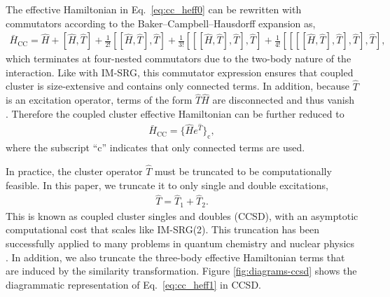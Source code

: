 The effective Hamiltonian in Eq.\ \eqref{eq:cc_heff0} can be rewritten with commutators according to the Baker--Campbell--Hausdorff expansion as,
\begin{align*}
  \bar{H}_{\mathrm{CC}} = \hat{H} + [\hat{H}, \hat{T}] + \frac{1}{2!} [[\hat{H}, \hat{T} ], \hat{T}] + \frac{1}{3!} [[[\hat{H}, \hat{T}], \hat{T}], \hat{T}] + \frac{1}{4!} [[[[\hat{H}, \hat{T}], \hat{T}], \hat{T}], \hat{T}],
\end{align*}
which terminates at four-nested commutators due to the two-body nature of the interaction.  Like with IM-SRG, this commutator expression ensures that coupled cluster is size-extensive and contains only connected terms.  In addition, because $\hat{T}$ is an excitation operator, terms of the form $\hat{T} \hat{H}$ are disconnected and thus vanish \cite{shavitt2009many}.  Therefore the coupled cluster effective Hamiltonian can be further reduced to
\begin{align} \label{eq:cc_heff1}
  \bar{H}_{\mathrm{CC}} = \bigl\{\hat{H}e^{\hat{T}}\bigr\}_{\mathrm{c}},
\end{align}
where the subscript ``$\mathrm{c}$'' indicates that only connected terms are used.

In practice, the cluster operator $\hat{T}$ must be truncated to be computationally feasible.  In this paper, we truncate it to only single and double excitations,
\begin{align*}
  \hat{T} = \hat{T}_1 + \hat{T}_2.
\end{align*}
This is known as coupled cluster singles and doubles (CCSD), with an asymptotic computational cost that scales like IM-SRG(2).  This truncation has been successfully applied to many problems in quantum chemistry \cite{RevModPhys.79.291} and nuclear physics \cite{0034-4885-77-9-096302}.  In addition, we also truncate the three-body effective Hamiltonian terms that are induced by the similarity transformation.  Figure \ref{fig:diagrams-ccsd} shows the diagrammatic representation of Eq.\ \eqref{eq:cc_heff1} in CCSD.

